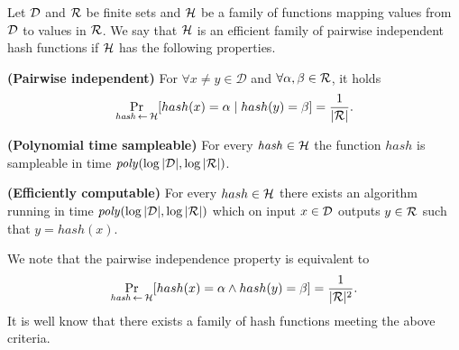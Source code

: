 \begin{definition}
Let $\mathcal{D}$ and $\mathcal{R}$ be finite sets and $\mathcal{H}$ be a family of functions mapping values from $\mathcal{D}$ to values in $\mathcal{R}$.
We say that $\mathcal{H}$ is an \textnormal{efficient family of pairwise independent hash functions}
if $\mathcal{H}$ has the following properties.

\textbf{(Pairwise independent)} For $\forall x \neq y \in \mathcal{D}$ and $\forall \alpha, \beta \in \mathcal{R}$, it holds
\begin{displaymath}
\underset{\hash \la0 \cH}{\Pr}[hash(x) = \alpha \mid hash(y) = \beta] = \frac{1}{|\cR|}.
\end{displaymath}

\textbf{(Polynomial time sampleable)} For every $\mathit{hash} \in \mathcal{H}$ the function $\mathit{hash}$ is sampleable in time $\mathit{poly}(\log|\mathcal{D}|, \log|\mathcal{R}|)$.

\textbf{(Efficiently computable)}
For every $hash \in \mathcal{H}$ there exists an algorithm running in time $\mathit{poly}(\log|\mathcal{D}|, \log|\mathcal{R}|)$ which
on input $x \in \mathcal{D}$ outputs $y \in \mathcal{R}$ such that $y = hash(x)$.
\end{definition}

We note that the pairwise independence property is equivalent to
\begin{displaymath}
\underset{\hash \la0 \cH}{\Pr}[hash(x) = \alpha \land hash(y) = \beta] = \frac{1}{|\cR|^2}.
\end{displaymath}
It is well know \cite{Carter:1977:UCH:800105.803400} that there exists a family of hash functions meeting the above criteria.

